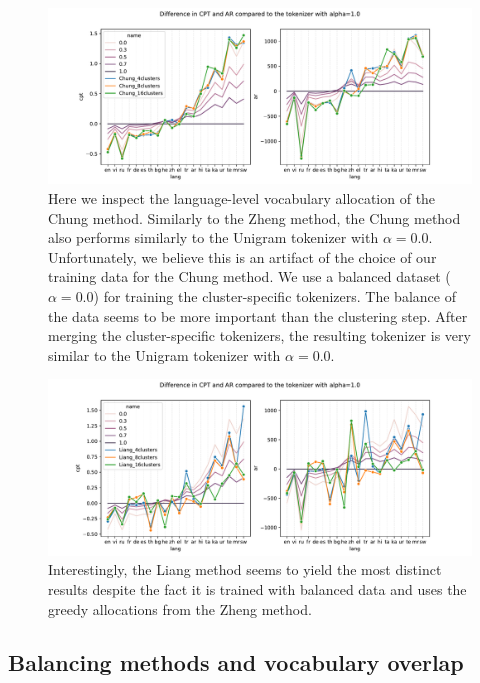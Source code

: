 \begin{figure}[H]
    \centering
    \includegraphics[width=\textwidth]{figures/chung_vs_alphas.pdf}
    \caption{Here we inspect the language-level vocabulary allocation of the Chung method. Similarly to the Zheng method, the Chung method also performs similarly to the Unigram tokenizer with $\alpha=0.0$. Unfortunately, we believe this is an artifact of the choice of our training data for the Chung method. We use a balanced dataset ($\alpha=0.0$) for training the cluster-specific tokenizers. The balance of the data seems to be more important than the clustering step. After merging the cluster-specific tokenizers, the resulting tokenizer is very similar to the Unigram tokenizer with $\alpha=0.0$.}
    \label{fig:chung_vs_alphas}
\end{figure}

\begin{figure}[H]
    \centering
    \includegraphics[width=\textwidth]{figures/liang_vs_alphas.pdf}
    \caption{Interestingly, the Liang method seems to yield the most distinct results despite the fact it is trained with balanced data and uses the greedy allocations from the Zheng method. }
    \label{fig:liang_vs_alphas}
\end{figure}

\subsection{Balancing methods and vocabulary overlap}

